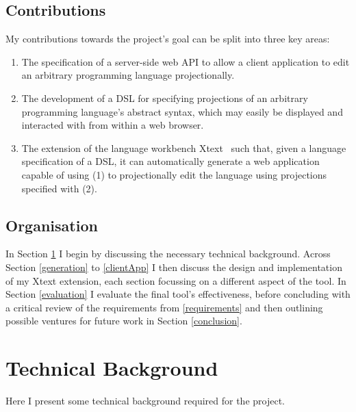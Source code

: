 \documentclass{article}
\begin{document}
\subsection{Contributions}

My contributions towards the project's goal can be split into three key areas:

\begin{enumerate}
\item The specification of a server-side web API to allow a client application to edit an arbitrary programming language projectionally.
\item The development of a DSL for specifying projections of an arbitrary programming language's abstract syntax, which may easily be displayed and interacted with from within a web browser.
\item The extension of the language workbench Xtext~\cite{xtext} such that, given a language specification of a DSL, it can automatically generate a web application capable of using (1) to projectionally edit the language using projections specified with (2).
\end{enumerate}


\subsection{Organisation} 
In Section \ref{technicalBackground} I begin by discussing the necessary technical background. Across Section \ref{generation} to \ref{clientApp} I then discuss the design and implementation of my Xtext extension, each section focussing on a different aspect of the tool. In Section \ref{evaluation} I evaluate the final tool's effectiveness, before concluding with a critical review of the requirements from \ref{requirements} and then outlining possible ventures for future work in Section \ref{conclusion}. 

\section{Technical Background}\label{technicalBackground}
Here I present some technical background required for the project.
\end{document}
